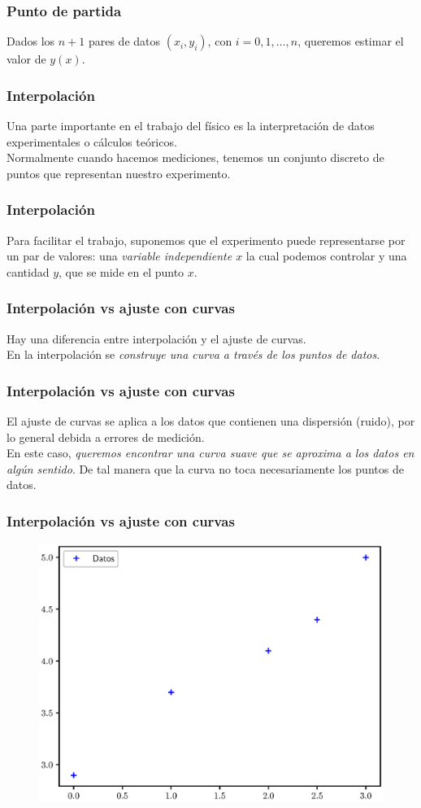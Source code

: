 \documentclass[12pt]{beamer}
\begin{document}
\begin{frame}
\frametitle{Punto de partida}
Dados los $n + 1$ pares de datos $(x_{i}, y_{i})$, con $i = 0, 1 , \ldots, n$, queremos estimar el valor de $y (x)$.
\end{frame}
\begin{frame}
\frametitle{Interpolación}
Una parte importante en el trabajo del físico es la interpretación de datos experimentales o cálculos teóricos.
\\
\bigskip
\pause
Normalmente cuando hacemos mediciones, tenemos un conjunto discreto de puntos que representan nuestro experimento.
\end{frame}
\begin{frame}
\frametitle{Interpolación}
Para facilitar el trabajo, suponemos que el experimento puede representarse por un par de valores: una \textit{variable independiente $x$} la cual podemos controlar y una cantidad $y$, que se mide en el punto $x$.
\end{frame}
\begin{frame}
\frametitle{Interpolación vs ajuste con curvas}
Hay una diferencia entre interpolación y el ajuste de curvas.
\\
\bigskip
\pause
En la interpolación se \emph{\textcolor{ao}{construye una curva a través de los puntos de datos}}.
\end{frame}
\begin{frame}
\frametitle{Interpolación vs ajuste con curvas}
El ajuste de curvas se aplica a los datos que contienen una dispersión (ruido), por lo general debida a errores de medición.
\\
\bigskip
\pause
En este caso, \emph{\textcolor{armygreen}{queremos encontrar una curva suave que se aproxima a los datos en algún sentido}}. \pause De tal manera que la curva no toca necesariamente los puntos de datos.
\end{frame}
\begin{frame}[fragile]
\frametitle{Interpolación vs ajuste con curvas}
\begin{figure}
    \centering
    \includegraphics[scale=0.6]{Imagenes/Intro_Interpolacion_001.eps}
\end{figure}
\end{frame}
\end{document}
